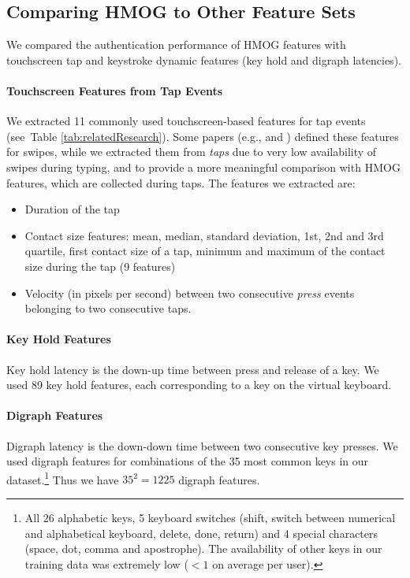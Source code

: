 \subsection{Comparing HMOG to Other Feature Sets}
We compared the authentication performance of HMOG features with touchscreen tap and keystroke dynamic features (key hold and digraph latencies). 

%


\paragraph{Touchscreen Features from Tap Events} 
We extracted 11 commonly used touchscreen-based features for tap events (see~Table \ref{tab:relatedResearch}). Some papers (e.g.,  \cite{serwadda2013} and \cite{frank2013}) defined these features for swipes, while we extracted them from {\em taps} due to very low availability of swipes during typing, and to provide a more meaningful comparison with HMOG features, which are collected during taps. The features we extracted are: 
\begin{itemize}
\item Duration of the tap
\item Contact size features: mean, median, standard deviation, 1st, 2nd and 3rd quartile, first contact size of a tap, minimum and maximum of the contact size during the tap (9 features) 
\item Velocity (in pixels per second) between two consecutive \textit{press} events belonging to two consecutive taps.
\end{itemize}


\paragraph{Key Hold Features}
Key hold latency is the down-up time between press and release of a key. We used 89 key hold features, each corresponding to a key on the virtual keyboard. 

\paragraph{Digraph Features}
Digraph latency is the down-down time between two consecutive key presses. We used digraph features for combinations of the 35 most common keys in our dataset.\footnote{All 26 alphabetic keys, 5 keyboard switches (shift, switch between numerical and alphabetical keyboard, delete, done, return) and 4 special characters (space, dot, comma and apostrophe). The availability of other keys in our training data was extremely low ($< 1$ on average per user).} Thus we have $35^2 = 1225$ digraph features.%


